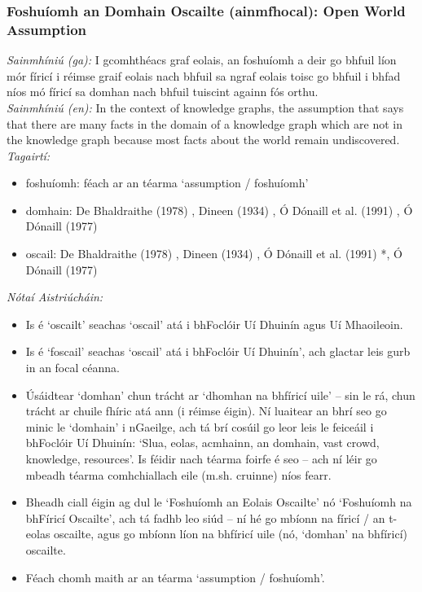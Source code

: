 \subsubsection*{Foshuíomh an Domhain Oscailte (ainmfhocal): Open World Assumption}
 \noindent \textit{Sainmhíniú (ga):} I gcomhthéacs graf eolais, an foshuíomh a deir go bhfuil líon mór fíricí i réimse graif eolais nach bhfuil sa ngraf eolais toisc go bhfuil i bhfad níos mó fíricí sa domhan nach bhfuil tuiscint againn fós orthu.
\\
 \noindent \textit{Sainmhíniú (en):} In the context of knowledge graphs, the assumption that says that there are many facts in the domain of a knowledge graph which are not in the knowledge graph because most facts about the world remain undiscovered.
\\
 \noindent \textit{Tagairtí:}
\begin{itemize}
	\item foshuíomh: féach ar an téarma `assumption / foshuíomh'
	\item domhain: De Bhaldraithe (1978) \cite{de-bhaldraithe}, Dineen (1934) \cite{dineen}, Ó Dónaill et al. (1991) \cite{focloir-beag}, Ó Dónaill (1977) \cite{odonaill}
	\item oscail: De Bhaldraithe (1978) \cite{de-bhaldraithe}, Dineen (1934) \cite{dineen}, Ó Dónaill et al. (1991) \cite{focloir-beag}*, Ó Dónaill (1977) \cite{odonaill}
\end{itemize}

 \noindent \textit{Nótaí Aistriúcháin:}
\begin{itemize}
	\item Is é `oscailt' seachas `oscail' atá i bhFoclóir Uí Dhuinín agus Uí Mhaoileoin.
	\item Is é `foscail' seachas `oscail' atá i bhFoclóir Uí Dhuinín', ach glactar leis gurb in an focal céanna.
	\item Úsáidtear `domhan' chun trácht ar `dhomhan na bhfíricí uile' -- sin le rá, chun trácht ar chuile fhíric atá ann (i réimse éigin). Ní luaitear an bhrí seo go minic le `domhain' i nGaeilge, ach tá brí cosúil go leor leis le feiceáil i bhFoclóir Uí Dhuinín: `Slua, eolas, acmhainn, an domhain, vast crowd, knowledge, resources'. Is féidir nach téarma foirfe é seo -- ach ní léir go mbeadh téarma comhchiallach eile (m.sh. cruinne) níos fearr.
	\item Bheadh ciall éigin ag dul le `Foshuíomh an Eolais Oscailte' nó `Foshuíomh na bhFíricí Oscailte', ach tá fadhb leo siúd -- ní hé go mbíonn na fíricí / an t-eolas oscailte, agus go mbíonn líon na bhfíricí uile (nó, `domhan' na bhfíricí) oscailte.
	\item Féach chomh maith ar an téarma `assumption / foshuíomh'.
\end{itemize}


